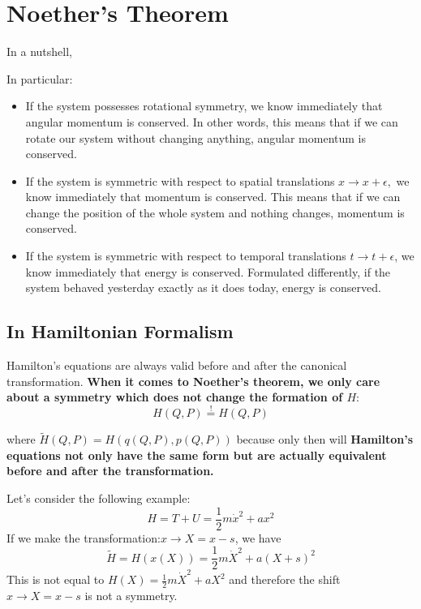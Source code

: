 \section{Noether's Theorem}
In a nutshell, \textbf{}

In particular:
\begin{qt}
    \begin{itemize}
        \item If the system possesses rotational symmetry, we know immediately that angular momentum is conserved. In other words, this means that if we can rotate our system without changing anything, angular momentum is conserved.
        \item If the system is symmetric with respect to spatial translations
$x \rightarrow x+\epsilon,$ we know immediately that momentum is conserved. This means that if we can change the position of the whole system and nothing changes, momentum is conserved.
    \item If the system is symmetric with respect to temporal translations $t\rightarrow t+\epsilon$, we know immediately that energy is conserved. Formulated differently, if the system behaved yesterday exactly as it does today, energy is conserved.
    \end{itemize}
\end{qt}

\subsection{In Hamiltonian Formalism}
Hamilton's equations are always valid before and after the canonical transformation. \textbf{When it comes to Noether’s theorem, we only care about a symmetry which does not change the formation of $H$}:
\begin{equation}
    H(Q, P) \stackrel{!}{=} H(Q, P)
    \label{hamilinvariant}
\end{equation}

where $\tilde{H}(Q, P)=H(q(Q, P), p(Q, P))$ because only then will \textbf{Hamilton's equations not only have the same form but are actually equivalent before and after the transformation.}

Let's consider the following example:
$$
H=T+U=\frac{1}{2} m \dot{x}^{2}+a x^{2}
$$
If we make the transformation:$x \rightarrow X=x-s$, we have
$$
\tilde{H}=H(x(X))=\frac{1}{2} m \dot{X}^{2}+a(X+s)^{2}
$$
This is not equal to $H(X)=\frac{1}{2} m \dot{X}^{2}+a X^{2}$ and therefore the shift $x \rightarrow X=x-s$ is not a symmetry.

